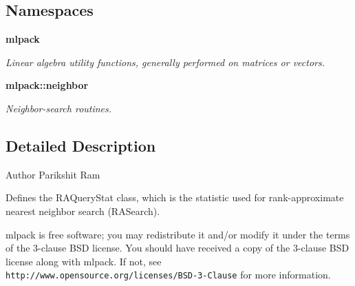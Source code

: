 \subsection*{Namespaces}
\begin{DoxyCompactItemize}
\item 
 {\bf mlpack}
\begin{DoxyCompactList}\small\item\em Linear algebra utility functions, generally performed on matrices or vectors. \end{DoxyCompactList}\item 
 {\bf mlpack\+::neighbor}
\begin{DoxyCompactList}\small\item\em Neighbor-\/search routines. \end{DoxyCompactList}\end{DoxyCompactItemize}


\subsection{Detailed Description}
\begin{DoxyAuthor}{Author}
Parikshit Ram
\end{DoxyAuthor}
Defines the R\+A\+Query\+Stat class, which is the statistic used for rank-\/approximate nearest neighbor search (R\+A\+Search).

mlpack is free software; you may redistribute it and/or modify it under the terms of the 3-\/clause B\+SD license. You should have received a copy of the 3-\/clause B\+SD license along with mlpack. If not, see {\tt http\+://www.\+opensource.\+org/licenses/\+B\+S\+D-\/3-\/\+Clause} for more information. 